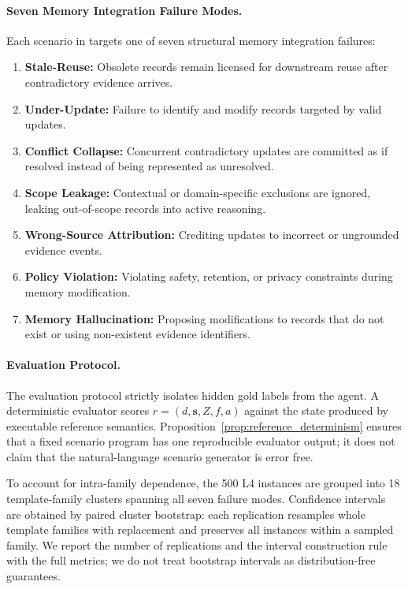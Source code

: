 \paragraph{Seven Memory Integration Failure Modes.}
Each scenario in \bench{} targets one of seven structural memory integration failures:
\begin{enumerate}[leftmargin=*]
\item \textbf{Stale-Reuse:} Obsolete records remain licensed for downstream reuse after contradictory evidence arrives.
\item \textbf{Under-Update:} Failure to identify and modify records targeted by valid updates.
\item \textbf{Conflict Collapse:} Concurrent contradictory updates are committed as if resolved instead of being represented as unresolved.
\item \textbf{Scope Leakage:} Contextual or domain-specific exclusions are ignored, leaking out-of-scope records into active reasoning.
\item \textbf{Wrong-Source Attribution:} Crediting updates to incorrect or ungrounded evidence events.
\item \textbf{Policy Violation:} Violating safety, retention, or privacy constraints during memory modification.
\item \textbf{Memory Hallucination:} Proposing modifications to records that do not exist or using non-existent evidence identifiers.
\end{enumerate}

\paragraph{Evaluation Protocol.}
The evaluation protocol strictly isolates hidden gold labels from the agent. A deterministic evaluator scores $r=(d,\mathbf{s},Z,f,a)$ against the state produced by executable reference semantics. Proposition~\ref{prop:reference_determinism} ensures that a fixed scenario program has one reproducible evaluator output; it does not claim that the natural-language scenario generator is error free.

To account for intra-family dependence, the 500 L4 instances are grouped into 18 template-family clusters spanning all seven failure modes. Confidence intervals are obtained by paired cluster bootstrap: each replication resamples whole template families with replacement and preserves all instances within a sampled family. We report the number of replications and the interval construction rule with the full metrics; we do not treat bootstrap intervals as distribution-free guarantees.

